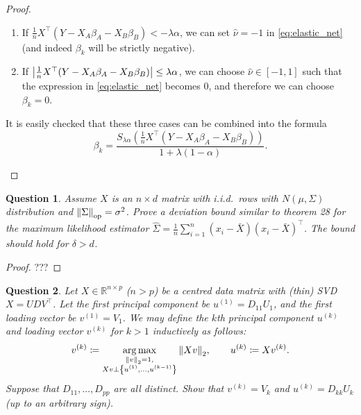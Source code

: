 \documentclass{article}
\theoremstyle{plain}
\newtheorem{question}{Question}
\theoremstyle{remark}
\newcommand{\Bb}{\mathbb}
\newcommand{\Rm}{\mathrm}
\newcommand{\RR}{\Bb R}
\newcommand{\T}{^\top} %
\newcommand\ceq\coloneqq %
\DeclareMathOperator*{\argmax}{arg\,max}
\begin{document}
\begin{proof}
\begin{enumerate}
\begin{enumerate}
		\item If $\frac1n X\T(Y - X_A\beta_A - X_B\beta_B) < -\lambda\alpha$, we can set $\hat\nu = -1$ in \cref{eq:elastic_net} (and indeed $\beta_k$ will be strictly negative). 
		\item If $\abs{\frac1nX\T (Y - X_A\beta_A - X_B\beta_B)} \leq \lambda\alpha$, we can choose $\hat\nu \in [-1, 1]$ such that the expression in \cref{eq:elastic_net} becomes 0, and therefore we can choose $\beta_k = 0$. 
	\end{enumerate}
	It is easily checked that these three cases can be combined into the formula
	\[
	\beta_k = \frac{S_{\lambda \alpha}(\frac1n X\T (Y - X_A \beta_A - X_B\beta_B))}{1 + \lambda(1-\alpha)}. 
	\]
	\end{enumerate}
\end{proof}

\begin{question}
	Assume $X$ is an $n \times d$ matrix with i.i.d.\ rows with $N(\mu, \Sigma)$ distribution and $\norm{\Sigma}_\Rm{op} = \sigma^2$. Prove a deviation bound similar to theorem 28 for the maximum likelihood estimator $\hat\Sigma = \frac1n \sum_{i=1}^n (x_i - \bar X)(x_i - \bar X)\T$. The bound should hold for $\delta > d$. 
\end{question}

\begin{proof}
	???
\end{proof}

\begin{question}
	Let $X \in \RR^{n \times p}$ ($n > p$) be a centred data matrix with (thin) SVD $X = UDV\T$. Let the first \emph{principal component} be $u^{(1)} = D_{11} U_1$, and the first \emph{loading vector} be $v^{(1)} = V_1$. We may define the $k$th principal component $u^{(k)}$ and loading vector $v^{(k)}$ for $k > 1$ inductively as follows:
	\begin{align*}
		v^{(k)} \ceq \argmax_{\substack{\norm{v}_2 = 1, \\ Xv \perp \qty{u^{(1)}, \dotsc, u^{(k-1)}}}} \norm{Xv}_2,  \qquad u^{(k)} \ceq Xv^{(k)}. 
	\end{align*}
Suppose that $D_{11}, \dotsc, D_{pp}$ are all distinct. Show that $v^{(k)} = V_k$ and $u^{(k)} = D_{kk} U_k$ (up to an arbitrary sign). 
\end{question}
\end{document}
